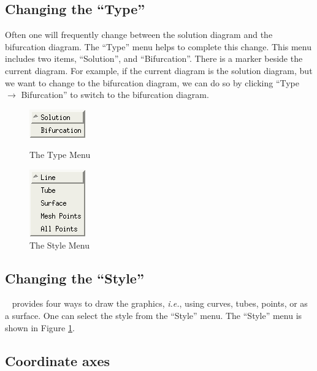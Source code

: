 \subsection{Changing the ``Type''}

Often one will frequently change between the solution diagram and the bifurcation diagram.
The ``Type'' menu helps to complete this change. This menu includes two
items, ``Solution'', and ``Bifurcation''. There is a marker beside the current
diagram. For example, if the current diagram is the solution diagram, 
but we want to change to the bifurcation diagram, 
we can do so by clicking ``Type $\to$ Bifurcation'' to switch to the
bifurcation diagram. 

\begin{figure}[!htmb]
\centering
    \begin{minipage}[b]{0.5\textwidth}
        \centering
        \includegraphics {./include/typeMenu}
        \caption{The Type Menu} \label{fig:tpyeMenu}
    \end{minipage}%
    \begin{minipage}[b]{0.5\textwidth}
        \centering
        \includegraphics {./include/styleMenuNew}
        \caption{The Style Menu} \label{fig:styleMenu}
    \end{minipage}
\end{figure}

\subsection{Changing the ``Style''}

\PLAUT~ provides four ways to draw the graphics, \textit{i.e.}, using 
curves, tubes, points, or as a surface. One can select the style from 
the ``Style'' menu. The ``Style'' menu is shown in Figure \ref{fig:styleMenu}.

\subsection{Coordinate axes} 

